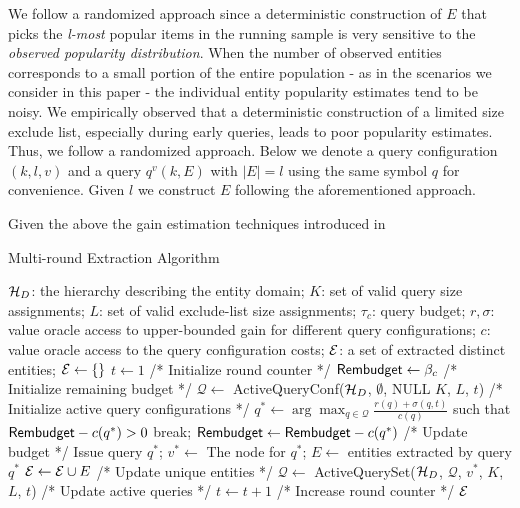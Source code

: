 We follow a randomized approach since a deterministic construction of $E$ that picks the {\em l-most} popular items in the running sample is very sensitive to the {\em observed popularity distribution}. When the number of observed entities corresponds to a small portion of the entire population - as in the scenarios we consider in this paper - the individual entity popularity estimates tend to be noisy.  We empirically observed that a deterministic construction of a limited size exclude list, especially during early queries, leads to poor popularity estimates. Thus, we follow a randomized approach. Below we denote a query configuration $(k,l,v)$ and a query $q^v(k,E)$ with $|E| = l$ using the same symbol $q$ for convenience. Given $l$ we construct $E$ following the aforementioned approach.

Given the above the gain estimation techniques introduced in \Cref{} 

\begin{algorithm}[h]
\small\caption{Multi-round Extraction Algorithm}
\label{algo:overall}
\begin{algorithmic}[1]
 $\mathcal{H}_D$: the hierarchy describing the entity domain; $K$: set of valid query size assignments; $L$: set of valid exclude-list size assignments; $\tau_c$: query budget; $r,\sigma$: value oracle access to upper-bounded gain for different query configurations; $c$: value oracle access to the query configuration costs;
 $\mathcal{E}$: a set of extracted distinct entities;
\STATE $\mathcal{E} \leftarrow \{\}$
\STATE $t \leftarrow 1$ /* Initialize round counter */
\STATE ${\sf Rembudget} \leftarrow \beta_c$ /* Initialize remaining budget */
\STATE $\mathcal{Q} \leftarrow$ {\sf ActiveQueryConf($\mathcal{H}_D$, $\emptyset$, NULL $K$, $L$, $t$)} /* Initialize active query configurations */
	\STATE $q^* \leftarrow \arg\max_{q \in {\mathcal{Q}}} \frac{r(q)+\sigma(q,t)}{c(q)}$ such that ${\sf Rembudget} - c(q^*) >0$
		\STATE break;
	\ENDIF
	\STATE ${\sf Rembudget} \leftarrow {\sf Rembudget} - c(q^*)$ /* Update budget */
	\STATE Issue query $q^*$; 
	\STATE $v^* \leftarrow $ The node for $q^*$;
	\STATE $E \leftarrow$ entities extracted by query $q^*$
	\STATE $\mathcal{E} \leftarrow \mathcal{E} \cup E$ /* Update unique entities */
	\STATE $\mathcal{Q} \leftarrow$ {\sf ActiveQuerySet($\mathcal{H}_D$, $\mathcal{Q}$, $v^*$, $K$, $L$, $t$)} /* Update active queries */
	\STATE $t \leftarrow t + 1$ /* Increase round counter */
\ENDWHILE
\RETURN $\mathcal{E}$
\end{algorithmic}
\end{algorithm}


